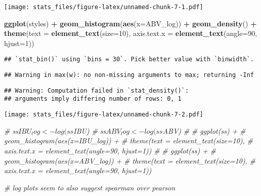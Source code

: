 \documentclass[]{article}
\newenvironment{Shaded}{\begin{snugshade}}{\end{snugshade}}
\newcommand{\KeywordTok}[1]{\textcolor[rgb]{0.13,0.29,0.53}{\textbf{#1}}}
\newcommand{\DataTypeTok}[1]{\textcolor[rgb]{0.13,0.29,0.53}{#1}}
\newcommand{\DecValTok}[1]{\textcolor[rgb]{0.00,0.00,0.81}{#1}}
\newcommand{\StringTok}[1]{\textcolor[rgb]{0.31,0.60,0.02}{#1}}
\newcommand{\CommentTok}[1]{\textcolor[rgb]{0.56,0.35,0.01}{\textit{#1}}}
\newcommand{\OperatorTok}[1]{\textcolor[rgb]{0.81,0.36,0.00}{\textbf{#1}}}
\newcommand{\NormalTok}[1]{#1}
\begin{document}
\texttt{[image: stats\_files/figure-latex/unnamed-chunk-7-1.pdf]}

\begin{Shaded}
\begin{Highlighting}[]
\KeywordTok{ggplot}\NormalTok{(styles) }\OperatorTok{+}
\StringTok{    }\KeywordTok{geom_histogram}\NormalTok{(}\KeywordTok{aes}\NormalTok{(}\DataTypeTok{x=}\NormalTok{ABV_log)) }\OperatorTok{+}
\StringTok{    }\KeywordTok{geom_density}\NormalTok{() }\OperatorTok{+}
\StringTok{    }\KeywordTok{theme}\NormalTok{(}\DataTypeTok{text =} \KeywordTok{element_text}\NormalTok{(}\DataTypeTok{size=}\DecValTok{10}\NormalTok{),}
        \DataTypeTok{axis.text.x =} \KeywordTok{element_text}\NormalTok{(}\DataTypeTok{angle=}\DecValTok{90}\NormalTok{, }\DataTypeTok{hjust=}\DecValTok{1}\NormalTok{)) }
\end{Highlighting}
\end{Shaded}

\begin{verbatim}
## `stat_bin()` using `bins = 30`. Pick better value with `binwidth`.
\end{verbatim}

\begin{verbatim}
## Warning in max(w): no non-missing arguments to max; returning -Inf
\end{verbatim}

\begin{verbatim}
## Warning: Computation failed in `stat_density()`:
## arguments imply differing number of rows: 0, 1
\end{verbatim}

\texttt{[image: stats\_files/figure-latex/unnamed-chunk-7-2.pdf]}

\begin{Shaded}
\begin{Highlighting}[]
\CommentTok{# ss$IBU_log <- log(ss$IBU)}
\CommentTok{# ss$ABV_log <- log(ss$ABV)}
\CommentTok{# }
\CommentTok{# ggplot(ss) +}
\CommentTok{#     geom_histogram(aes(x=IBU_log)) +}
\CommentTok{#     theme(text = element_text(size=10),}
\CommentTok{#         axis.text.x = element_text(angle=90, hjust=1)) }
\CommentTok{# }
\CommentTok{# ggplot(ss) +}
\CommentTok{#     geom_histogram(aes(x=ABV_log)) +}
\CommentTok{#     theme(text = element_text(size=10),}
\CommentTok{#         axis.text.x = element_text(angle=90, hjust=1)) }


\CommentTok{# log plots seem to also suggest spearman over pearson}
\end{Highlighting}
\end{Shaded}
\end{document}
